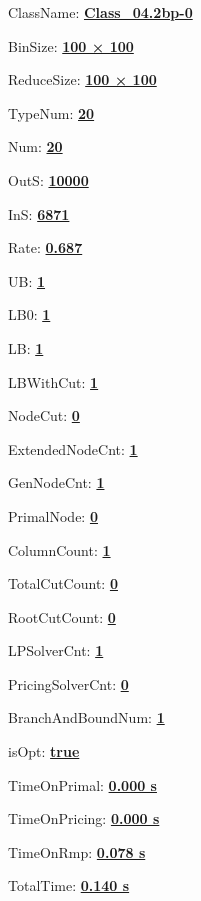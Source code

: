 \documentclass[11pt]{article}
\begin{document}
\pagestyle{empty}


ClassName: \underline{\textbf{Class_04.2bp-0}}
\par
BinSize: \underline{\textbf{100 × 100}}
\par
ReduceSize: \underline{\textbf{100 × 100}}
\par
TypeNum: \underline{\textbf{20}}
\par
Num: \underline{\textbf{20}}
\par
OutS: \underline{\textbf{10000}}
\par
InS: \underline{\textbf{6871}}
\par
Rate: \underline{\textbf{0.687}}
\par
UB: \underline{\textbf{1}}
\par
LB0: \underline{\textbf{1}}
\par
LB: \underline{\textbf{1}}
\par
LBWithCut: \underline{\textbf{1}}
\par
NodeCut: \underline{\textbf{0}}
\par
ExtendedNodeCnt: \underline{\textbf{1}}
\par
GenNodeCnt: \underline{\textbf{1}}
\par
PrimalNode: \underline{\textbf{0}}
\par
ColumnCount: \underline{\textbf{1}}
\par
TotalCutCount: \underline{\textbf{0}}
\par
RootCutCount: \underline{\textbf{0}}
\par
LPSolverCnt: \underline{\textbf{1}}
\par
PricingSolverCnt: \underline{\textbf{0}}
\par
BranchAndBoundNum: \underline{\textbf{1}}
\par
isOpt: \underline{\textbf{true}}
\par
TimeOnPrimal: \underline{\textbf{0.000 s}}
\par
TimeOnPricing: \underline{\textbf{0.000 s}}
\par
TimeOnRmp: \underline{\textbf{0.078 s}}
\par
TotalTime: \underline{\textbf{0.140 s}}
\par
\newpage
\end{document}

